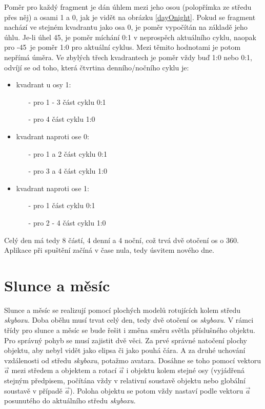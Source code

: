 Poměr pro každý fragment je dán úhlem mezi jeho osou (polopřímka ze středu přes něj) a osami 1 a 0, jak je vidět na obrázku \ref{dayOnight}. Pokud se fragment nachází ve stejném kvadrantu jako osa 0, je poměr vypočítán na základě jeho úhlu. Je-li úhel 45\degree,  je poměr míchání 0:1 v neprospěch aktuálního cyklu, naopak pro -45\degree~je poměr 1:0 pro aktuální cyklus. Mezi těmito hodnotami je potom nepřímá úměra. Ve zbylých třech kvadrantech je poměr vždy buď 1:0 nebo 0:1, odvíjí se od toho, která čtvrtina  denního/nočního cyklu je:
\begin{itemize}
	\item kvadrant u osy 1:
	\begin{itemize}
		\item[-] pro 1 - 3 část cyklu 0:1
		\item[-] pro 4 část cyklu 1:0 
	\end{itemize}
	\item kvadrant naproti ose 0:
		\begin{itemize}
		\item[-] pro 1 a 2 část cyklu 0:1
		\item[-] pro 3 a 4 část cyklu 1:0
	\end{itemize} 
	\item kvadrant naproti ose 1:
		\begin{itemize}
		\item[-] pro 1 část cyklu 0:1
		\item[-] pro 2 - 4 část cyklu 1:0 
	\end{itemize}
\end{itemize}
Celý den má tedy 8 částí, 4 denní a 4 noční, což trvá dvě otočení os o 360\degree. Aplikace při spuštění začíná v čase nula, tedy úsvitem nového dne.
\section{Slunce a měsíc} 
Slunce a měsíc se realizují pomocí plochých modelů rotujících kolem středu \emph{skyboxu}. Doba oběhu musí trvat celý den, tedy dvě otočení os \emph{skyboxu}. V rámci třídy pro slunce a měsíc se bude řešit i změna směru světla příslušného objektu. Pro správný pohyb se musí zajistit dvě věci. Za prvé správné natočení plochy objektu, aby nebyl vidět jako elipsa či jako pouhá čára. A za druhé uchování vzdálenosti od středu \emph{skyboxu}, potažmo avatara. Dosáhne se toho pomocí vektoru $\vec{a}$ mezi středem a objektem a rotací $\vec{a}$ i objektu kolem stejné osy (vyjádřená stejným předpisem, počítána vždy v relativní soustavě objektu nebo globální soustavě v případě $\vec{a}$). Poloha objektu se potom vždy nastaví podle vektoru $\vec{a}$ posunutého do aktuálního středu \emph{skyboxu}.
